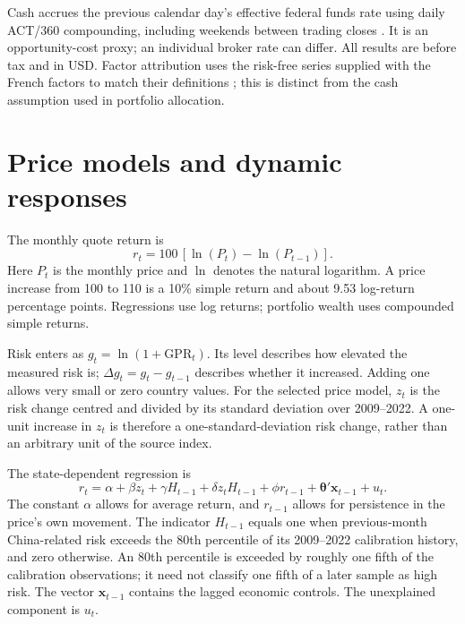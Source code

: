 Cash accrues the previous calendar day's effective federal funds rate using daily ACT/360 compounding, including weekends between trading closes \citep{fred2026}. It is an opportunity-cost proxy; an individual broker rate can differ. All results are before tax and in USD. Factor attribution uses the risk-free series supplied with the French factors to match their definitions \citep{french2026}; this is distinct from the cash assumption used in portfolio allocation.


\section{Price models and dynamic responses}

The monthly quote return is
\begin{equation}
r_t=100\,[\ln(P_t)-\ln(P_{t-1})].
\label{eq:return}
\end{equation}
Here $P_t$ is the monthly price and $\ln$ denotes the natural logarithm. A price increase from 100 to 110 is a 10\% simple return and about 9.53 log-return percentage points. Regressions use log returns; portfolio wealth uses compounded simple returns.

Risk enters as $g_t=\ln(1+\mathrm{GPR}_t)$. Its level describes how elevated the measured risk is; $\Delta g_t=g_t-g_{t-1}$ describes whether it increased. Adding one allows very small or zero country values. For the selected price model, $z_t$ is the risk change centred and divided by its standard deviation over 2009–2022. A one-unit increase in $z_t$ is therefore a one-standard-deviation risk change, rather than an arbitrary unit of the source index.

The state-dependent regression is
\begin{equation}
r_t=\alpha+\beta z_t+\gamma H_{t-1}+\delta z_tH_{t-1}
       +\phi r_{t-1}+\symbf{\theta}'\symbf{x}_{t-1}+u_t.
\label{eq:state}
\end{equation}
The constant $\alpha$ allows for average return, and $r_{t-1}$ allows for persistence in the price's own movement. The indicator $H_{t-1}$ equals one when previous-month China-related risk exceeds the 80th percentile of its 2009–2022 calibration history, and zero otherwise. An 80th percentile is exceeded by roughly one fifth of the calibration observations; it need not classify one fifth of a later sample as high risk. The vector $\symbf{x}_{t-1}$ contains the lagged economic controls. The unexplained component is $u_t$.

